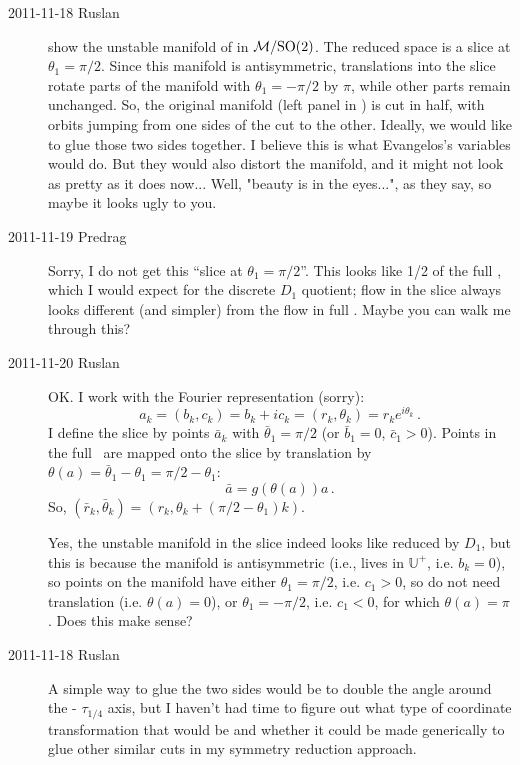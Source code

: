 \begin{description}
\item[2011-11-18 Ruslan]  show the
unstable manifold of  in ${\cal M}/\textrm{SO}(2)$. The reduced space is a
slice at $\theta_1 = \pi/2$. Since this manifold is antisymmetric,
translations into the slice rotate parts of the manifold with $\theta_1 =
-\pi/2$ by $\pi$, while other parts remain unchanged.  So, the original
manifold (left panel in ) is cut in half, with
orbits jumping from one sides of the cut to the other.  Ideally, we would
like to glue those two sides together. I believe this is what Evangelos's
variables would do.  But they would also distort the manifold, and it
might not look as pretty as it does now... Well, "beauty is in the
eyes...", as they say, so maybe it looks ugly to you.

\item[2011-11-19 Predrag] Sorry, I do not get this ``slice at $\theta_1 =
\pi/2$''. This looks like 1/2 of the full \statesp, which I would expect
for the discrete $D_1$ quotient; flow in the slice always looks different
(and simpler) from the flow in full \statesp. Maybe you can walk me
through this?

\item[2011-11-20 Ruslan] OK. I work with the Fourier representation (sorry):
\[ a_k = (b_k, c_k) = b_k + ic_k = (r_k, \theta_k) = r_k e^{i\theta_k}\,. \]
I define the slice by points $\bar{a}_k$ with $\bar{\theta}_1 = \pi/2$  (or $\bar{b}_1 = 0$, $\bar{c}_1 > 0$).  Points in the full \statesp\ are mapped onto the slice by translation by $\theta(a) = \bar{\theta}_1 - \theta_1 = \pi/2 - \theta_1$:
\[ \bar{a} = g(\theta(a)) a\,. \]
So, $(\bar{r}_k, \bar{\theta}_k) = (r_k, \theta_k + (\pi/2 - \theta_1)k)$.

Yes, the  unstable manifold in the slice indeed looks like reduced by $D_1$, but this is because the manifold is antisymmetric (i.e., lives in $\mathbb{U}^+$, i.e. $b_k = 0$), so points on the manifold have either $\theta_1 = \pi/2$, i.e. $c_1 > 0$, so do not need translation (i.e. $\theta(a) = 0$), or $\theta_1 = -\pi/2$, i.e. $c_1 < 0$, for which $\theta(a) = \pi$.  Does this make sense?

\item[2011-11-18 Ruslan]
    A simple way to glue the two sides would be to double the angle
    around the  - $\tau_{1/4}$  axis, but I haven't had
    time to figure out what type of coordinate transformation that would
    be and whether it could be made generically to glue other similar
    cuts in my symmetry reduction approach.


\end{description}
